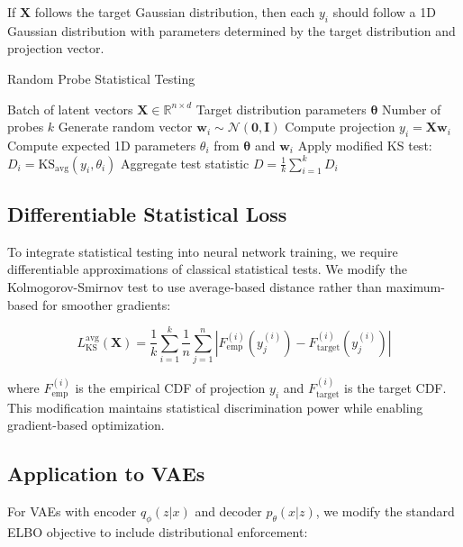 \documentclass{article}
\begin{document}
If $\mathbf{X}$ follows the target Gaussian distribution, then each $y_i$ should follow a 1D Gaussian distribution with parameters determined by the target distribution and projection vector.

\begin{algorithm}[tb]
\caption{Random Probe Statistical Testing}
\label{alg:random_probe}
\begin{algorithmic}[1]
\REQUIRE Batch of latent vectors $\mathbf{X} \in \mathbb{R}^{n \times d}$
\REQUIRE Target distribution parameters $\boldsymbol{\theta}$
\REQUIRE Number of probes $k$
    \STATE Generate random vector $\mathbf{w}_i \sim \mathcal{N}(\mathbf{0}, \mathbf{I})$
    \STATE Compute projection $y_i = \mathbf{X} \mathbf{w}_i$
    \STATE Compute expected 1D parameters $\theta_i$ from $\boldsymbol{\theta}$ and $\mathbf{w}_i$
    \STATE Apply modified KS test: $D_i = \text{KS}_{\text{avg}}(y_i, \theta_i)$
\ENDFOR
\RETURN Aggregate test statistic $D = \frac{1}{k} \sum_{i=1}^k D_i$
\end{algorithmic}
\end{algorithm}

\subsection{Differentiable Statistical Loss}

To integrate statistical testing into neural network training, we require differentiable approximations of classical statistical tests. We modify the Kolmogorov-Smirnov test to use average-based distance rather than maximum-based for smoother gradients:

\begin{equation}
L_{\text{KS}}^{\text{avg}}(\mathbf{X}) = \frac{1}{k} \sum_{i=1}^k \frac{1}{n} \sum_{j=1}^n |F_{\text{emp}}^{(i)}(y_j^{(i)}) - F_{\text{target}}^{(i)}(y_j^{(i)})|
\end{equation}

where $F_{\text{emp}}^{(i)}$ is the empirical CDF of projection $y_i$ and $F_{\text{target}}^{(i)}$ is the target CDF. This modification maintains statistical discrimination power while enabling gradient-based optimization.

\subsection{Application to VAEs}

For VAEs with encoder $q_{\phi}(z|x)$ and decoder $p_{\theta}(x|z)$, we modify the standard ELBO objective to include distributional enforcement:
\end{document}
